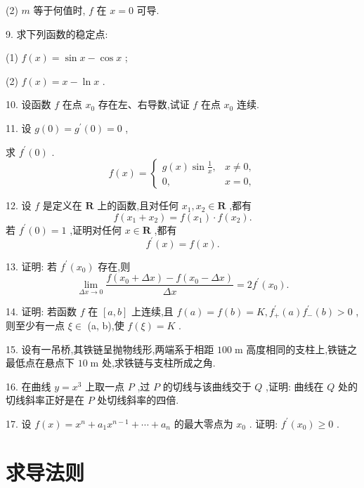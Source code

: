 (2) \(m\) 等于何值时, \(f\) 在 \(x = 0\) 可导.

9. 求下列函数的稳定点:

(1) \(f\left( x\right)  = \sin x - \cos x\) ;

(2) \(f\left( x\right)  = x - \ln x\) .

10. 设函数 \(f\) 在点 \({x}_{0}\) 存在左、右导数,试证 \(f\) 在点 \({x}_{0}\) 连续.

11. 设 \(g\left( 0\right)  = {g}^{\prime }\left( 0\right)  = 0\) ,

求 \({f}^{\prime }\left( 0\right)\) .
\[
f\left( x\right)  = \left\{  \begin{matrix} g\left( x\right) \sin \frac{1}{x}, & x \neq  0, \\  0, & x = 0, \end{matrix}\right.
\]

12. 设 \(f\) 是定义在 \(\mathbf{R}\) 上的函数,且对任何 \({x}_{1},{x}_{2} \in  \mathbf{R}\) ,都有
\[
f\left( {{x}_{1} + {x}_{2}}\right)  = f\left( {x}_{1}\right)  \cdot  f\left( {x}_{2}\right) .
\]
若 \({f}^{\prime }\left( 0\right)  = 1\) ,证明对任何 \(x \in  \mathbf{R}\) ,都有
\[
{f}^{\prime }\left( x\right)  = f\left( x\right) .
\]

13. 证明: 若 \({f}^{\prime }\left( {x}_{0}\right)\) 存在,则
\[
\mathop{\lim }\limits_{{{\Delta x} \rightarrow  0}}\frac{f\left( {{x}_{0} + {\Delta x}}\right)  - f\left( {{x}_{0} - {\Delta x}}\right) }{\Delta x} = 2{f}^{\prime }\left( {x}_{0}\right) .
\]

14. 证明: 若函数 \(f\) 在 \(\left\lbrack  {a,b}\right\rbrack\) 上连续,且 \(f\left( a\right)  = f\left( b\right)  = K,{f}_{ + }^{\prime }\left( a\right) {f}_{ - }^{\prime }\left( b\right)  > 0\) ,则至少有一点 \(\xi  \in\) (a, b),使 \(f\left( \xi \right)  = K\) .

15. 设有一吊桥,其铁链呈抛物线形,两端系于相距 \({100}\mathrm{\;m}\) 高度相同的支柱上,铁链之最低点在悬点下 \({10}\mathrm{\;m}\) 处,求铁链与支柱所成之角.

16. 在曲线 \(y = {x}^{3}\) 上取一点 \(P\) ,过 \(P\) 的切线与该曲线交于 \(Q\) ,证明: 曲线在 \(Q\) 处的切线斜率正好是在 \(P\) 处切线斜率的四倍.

17. 设 \(f\left( x\right)  = {x}^{n} + {a}_{1}{x}^{n - 1} + \cdots  + {a}_{n}\) 的最大零点为 \({x}_{0}\) . 证明: \({f}^{\prime }\left( {x}_{0}\right)  \geq  0\) .

\section{求导法则}

